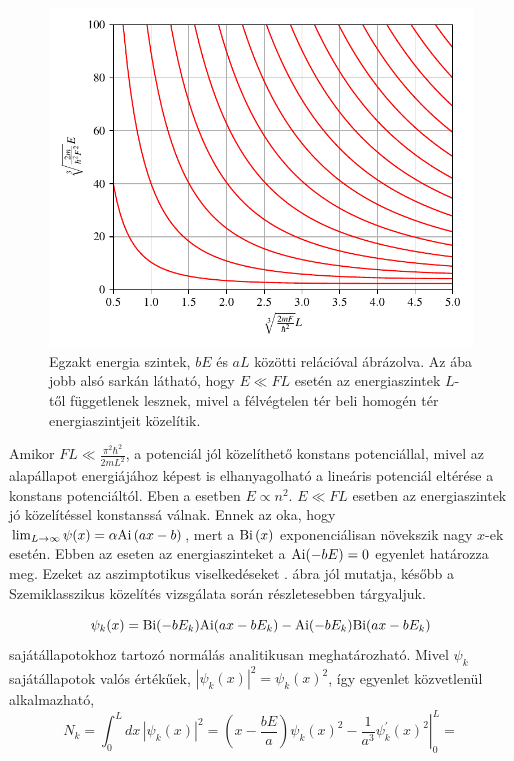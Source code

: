 \begin{figure}[H]
	\includegraphics[scale=1]{./figs/energiaszintek.pdf}
	\caption[Egzakt energiaszintek]{Egzakt energia szintek, $bE$ és $aL$ közötti relációval ábrázolva. Az ába jobb alsó sarkán látható, hogy $E \ll FL$ esetén az energiaszintek $L$-től függetlenek lesznek, mivel a félvégtelen tér beli homogén tér energiaszintjeit közelítik.}
	\label{box_energiaszintek_abra}
\end{figure}
Amikor $FL \ll \frac{\pi^2\hbar^2}{2mL^2}$, a potenciál jól közelíthető konstans potenciállal, mivel az alapállapot energiájához képest is elhanyagolható a lineáris potenciál eltérése a konstans potenciáltól. Eben a esetben $E \propto n^2$. $E \ll FL$ esetben az energiaszintek jó közelítéssel konstanssá válnak. Ennek az oka, hogy $\lim_{L \to \infty}\psi(x) = \alpha \mathrm{Ai}\left(ax-b\right)$, mert a $\mathrm{Bi}\left(x\right)$ exponenciálisan növekszik nagy $x$-ek esetén. Ebben az eseten az energiaszinteket a $\mathrm{Ai}(-bE) = 0$ egyenlet határozza meg. Ezeket az aszimptotikus viselkedéseket . ábra jól mutatja, később a Szemiklasszikus közelítés vizsgálata során részletesebben tárgyaljuk.

\begin{equation}
	\psi_k(x) = \mathrm{Bi}(-bE_k)\mathrm{Ai}(ax-bE_k) - \mathrm{Ai}(-bE_k)\mathrm{Bi}(ax-bE_k)
\end{equation}
sajátállapotokhoz tartozó normálás analitikusan meghatározható. Mivel $\psi_k$ sajátállapotok valós értékűek, $\left|\psi_k(x)\right|^2 = \psi_k(x)^2$, így  egyenlet közvetlenül alkalmazható,
\begin{equation}
	N_k = \int_0^Ldx\,\left|\psi_k(x)\right|^2 = \left.\left(x-\frac{bE}{a}\right)\psi_k(x)^2 - \frac{1}{a^3}\psi_k^\prime(x)^2\right|_0^L = 
\end{equation}
	
